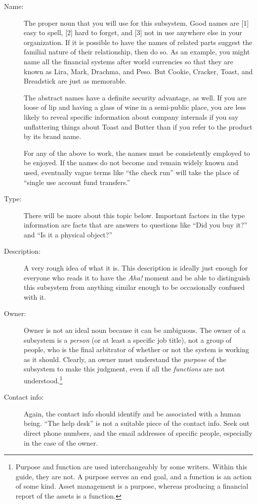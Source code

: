 \documentclass[11pt,letterpaper,twosided]{memoir}
\begin{document}
\begin{description}
\item[Name:] The proper noun that you will use for this subsystem.
Good names are [1] easy to spell, [2] hard to forget, and [3] not
in use anywhere else in your organization. If it is possible to
have the names of related parts suggest the familial nature of their
relationship, then do so. As an example, you might name all the
financial systems after world currencies so that they are known as
Lira, Mark, Drachma, and Peso. But Cookie, Cracker, Toast, and
Breadstick are just as memorable.

The abstract names have a definite security advantage, as well. If
you are loose of lip and having a glass of wine in a semi-public
place, you are less likely to reveal specific information about
company internals if you say unflattering things about Toast and
Butter than if you refer to the product by its brand name.

For any of the above to work, the names must be consistently 
employed to be enjoyed. If the names do not become and remain
widely known and used, eventually vague terms like ``the check run''
will take the place of ``single use account fund transfers.''

\item[Type:] There will be more about this topic below. Important 
factors in the type information are facts that are answers to questions
like ``Did you buy it?'' and ``Is it a physical object?''

\item[Description:] A very rough idea of what it is. This description
is ideally just enough for everyone who reads it to have the
\emph{Aha!} moment and be able to distinguish this subsystem from
anything similar enough to be occasionally confused with it.

\item[Owner:] Owner is not an ideal noun because it can be ambiguous.
The owner of a subsystem is a \emph{person} (or at least a specific
job title), not a group of people,
who is the final arbitrator of whether or not the system is working
as it should. Clearly, an owner must understand the \emph{purpose}
of the subsystem to make this judgment, even if all the \emph{functions}
are not understood.\footnote{Purpose and function are used
interchangeably by some writers.  Within this guide, they are not.
A purpose serves an end goal, and a function is an action
of some kind. Asset management is a purpose, whereas producing a
financial report of the assets is a function.}

\item[Contact info:] Again, the contact info should identify and
be associated with a human being. ``The help desk'' is not a suitable
piece of the contact info. Seek out direct phone numbers, and the
email addresses of specific people, especially in the case of the
owner.


\end{description}
\end{document}
